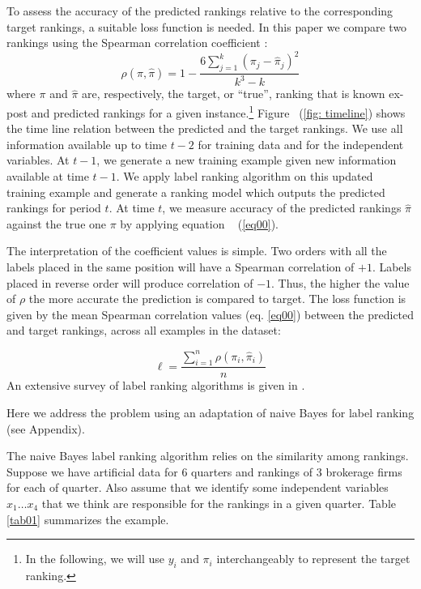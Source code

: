To assess the accuracy of the predicted rankings relative to the corresponding target rankings, a suitable loss function is needed. In this paper we compare two rankings using the Spearman correlation coefficient \cite{brazdil2003,vembu2009}:
\begin{equation}
\label{eq00}
 \rho(\pi,\hat{\pi})=1-\frac{6\sum_{j=1}^k(\pi_j-\hat{\pi}_j)^2}{k^3-k}
\end{equation}
where $\pi$ and $\hat{\pi}$ are, respectively, the target, or ``true'', ranking that is known ex-post  and predicted rankings for a given instance.\footnote{ In the following, we will use $y_i$ and $\pi_i$ interchangeably to represent the target ranking.} Figure ~(\ref{fig: timeline}) shows the time line relation between the predicted and the target rankings. We use all information available up to time $t-2$ for training data and for the independent variables. At $t-1$, we generate a new training example given new information available at time $t-1$. We apply label ranking algorithm on this updated training example and generate a ranking model which outputs the predicted rankings for period $t$. At time $t$, we measure accuracy of the predicted rankings $\hat{\pi}$ against the true one $\pi$ by applying equation ~ (\ref{eq00}).

The interpretation of the coefficient values is simple. Two orders with all the labels placed in the same position will have a Spearman correlation of $+1$. Labels placed in reverse order will produce  correlation of $-1$. Thus, the higher the value of $\rho$ the more accurate the prediction is compared to target. The loss function is given by the mean Spearman correlation values (eq. \ref{eq00}) between the predicted and target rankings, across all examples in the dataset:


\begin{equation}
\label{loss}
 \ell=\frac{\sum_{i=1}^n \rho(\pi_i,\hat{\pi}_i)}{n}
\end{equation}
An extensive survey of label ranking algorithms is given in \cite{vembu2009}.


Here we address the problem using an adaptation of naive Bayes for label ranking \citep{aiguzhinov2010} (see Appendix). 

The naive Bayes label ranking algorithm relies on the similarity  among rankings. Suppose we have  artificial data for 6 quarters and rankings of 3 brokerage firms  for each of  quarter. Also assume that we identify some independent variables $x_1 \ldots x_4$ that we think are responsible for the rankings in a given quarter. Table \ref{tab01} summarizes the example. 


